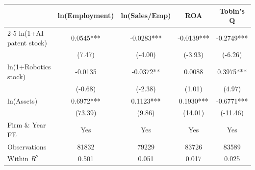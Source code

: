 \begin{tabular}{lcccc}
\toprule
 & ln(Employment) & ln(Sales/Emp) & ROA & Tobin's Q \\
\cmidrule(lr){2-5}
ln(1+AI patent stock) & 0.0545*** & -0.0283*** & -0.0139*** & -0.2749*** \\
 & (7.47) & (-4.00) & (-3.93) & (-6.26) \\[3pt]
ln(1+Robotics stock) & -0.0135 & -0.0372** & 0.0088 & 0.3975*** \\
 & (-0.68) & (-2.38) & (1.01) & (4.97) \\[3pt]
ln(Assets) & 0.6972*** & 0.1123*** & 0.1930*** & -0.6771*** \\
 & (73.39) & (9.86) & (14.01) & (-11.46) \\[3pt]
\midrule
Firm \& Year FE & Yes & Yes & Yes & Yes \\
Observations & 81832 & 79229 & 83726 & 83589 \\
Within $R^2$ & 0.501 & 0.051 & 0.017 & 0.025 \\
\bottomrule
\end{tabular}